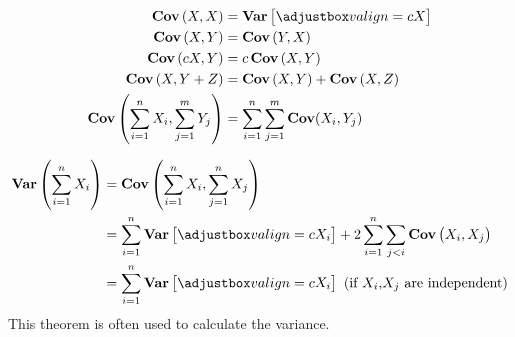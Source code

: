 \begin{theorem}
    \begin{equation}
        \begin{aligned}
            \covariance{X}{X} &= \variance{X} \\
            \covariance{X}{Y} &= \covariance{Y}{X} \\
            \covariance{cX}{Y} &= c \covariance{X}{Y} \\
            \covariance{X}{Y + Z} &= \covariance{X}{Y} + \covariance{X}{Z} \\
            \mathhilight{Cov} \left(\sum_{i=1}^n X_i, \sum_{j=1}^m Y_j \right) &= \sum_{i=1}^n \sum_{j=1}^m \mathhilight{Cov}(X_i, Y_j) \\
        \end{aligned}
    \end{equation}    
\end{theorem}

\begin{theorem}
    \begin{equation}
    \begin{aligned}
        \mathhilight{Var} \left( \sum_{i=1}^n X_i \right) &= \mathhilight{Cov}\left( \sum_{i=1}^n X_i, \sum_{j=1}^n X_j \right) \\
        &= \sum_{i=1}^n \variance{X_i} + 2 \sum_{i=1}^n \sum_{j < i} \covariance{X_i}{X_j} \\
        &= \sum_{i=1}^n \variance{X_i} \text{ (if } X_i \text{,} X_j \text{ are independent)}
    \end{aligned}
    \end{equation}
    This theorem is often used to calculate the variance.
\end{theorem}

